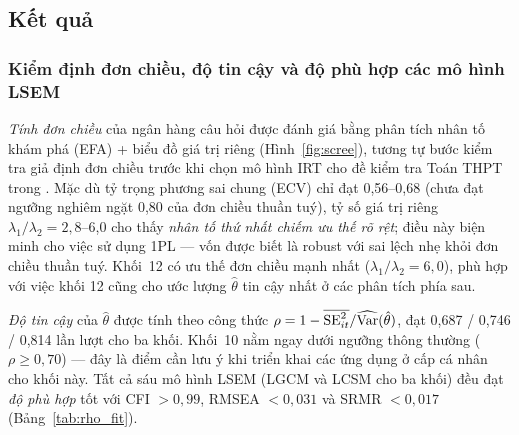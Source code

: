 
\subsection{Kết quả}
\label{sec:results}

\subsubsection{Kiểm định đơn chiều, độ tin cậy và độ phù hợp các mô hình LSEM}

\textit{Tính đơn chiều} của ngân hàng câu hỏi được đánh giá bằng phân tích nhân tố khám phá (EFA) + biểu đồ giá trị riêng (Hình~\ref{fig:scree}), tương tự bước kiểm tra giả định đơn chiều trước khi chọn mô hình IRT cho đề kiểm tra Toán THPT trong \cite{buhay2026shstat}. Mặc dù tỷ trọng phương sai chung (ECV) chỉ đạt 0{,}56--0{,}68 (chưa đạt ngưỡng nghiêm ngặt 0{,}80 của đơn chiều thuần tuý), tỷ số giá trị riêng \(\lambda_1/\lambda_2 = 2{,}8\)--6{,}0 cho thấy \emph{nhân tố thứ nhất chiếm ưu thế rõ rệt}; điều này biện minh cho việc sử dụng 1PL --- vốn được biết là robust với sai lệch nhẹ khỏi đơn chiều thuần tuý. Khối~12 có ưu thế đơn chiều mạnh nhất (\(\lambda_1/\lambda_2 = 6{,}0\)), phù hợp với việc khối 12 cũng cho ước lượng \(\hat\theta\) tin cậy nhất ở các phân tích phía sau.

\textit{Độ tin cậy} của \(\hat{\theta}\) được tính theo công thức \(\rho = 1 - \overline{\mathrm{SE}_{it}^2}/\widehat{\mathrm{Var}}(\hat\theta)\), đạt 0{,}687 / 0{,}746 / 0{,}814 lần lượt cho ba khối. Khối~10 nằm ngay dưới ngưỡng thông thường (\(\rho \ge 0{,}70\)) --- đây là điểm cần lưu ý khi triển khai các ứng dụng ở cấp cá nhân cho khối này. Tất cả sáu mô hình LSEM (LGCM và LCSM cho ba khối) đều đạt \textit{độ phù hợp} tốt với CFI \(> 0{,}99\), RMSEA \(< 0{,}031\) và SRMR \(< 0{,}017\) (Bảng~\ref{tab:rho_fit}).

